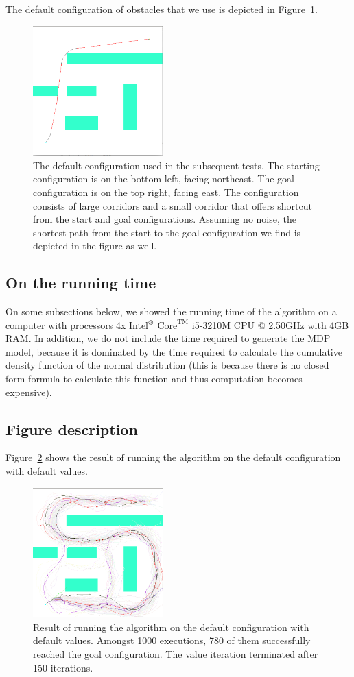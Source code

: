 \documentclass[a4paper]{article}
\begin{document}
The default configuration of obstacles that we use is depicted in
Figure~\ref{f:b_shortest}.

\begin{figure}
\caption{The default configuration used in the subsequent tests. The starting
  configuration is on the bottom left, facing northeast. The goal configuration
  is on the top right, facing east. The configuration consists
  of large corridors and a small corridor that offers shortcut from the start
  and goal configurations. Assuming no noise, the shortest path from the start
to the goal configuration we find is depicted in the figure as well.}
\label{f:b_shortest}
\centerline{\includegraphics[width=5cm]{b_shortest.png}}
\end{figure}

\subsection{On the running time}
On some subsections below, we showed the running time of the algorithm on
a computer with processors 4x Intel$^\text{\textregistered}$ $\text{Core}^{\text{TM}}$ i5-3210M CPU @ 2.50GHz with 4GB RAM. In addition, we do not
include the time required to generate the MDP model, because it is dominated
by the time required to calculate the cumulative density function of the
normal distribution (this is because there is no closed form formula to
calculate this function and thus computation becomes expensive).

\subsection{Figure description}
Figure~\ref{f:b} shows the result of running the algorithm on the default
configuration with default values.

\begin{figure}
\caption{Result of running the algorithm on the default configuration with default values.
Amongst 1000 executions, 780 of them successfully reached the goal configuration.
The value iteration terminated after 150 iterations.}
\label{f:b}
\centerline{\includegraphics[width=5cm]{b.png}}
\end{figure}
\end{document}
